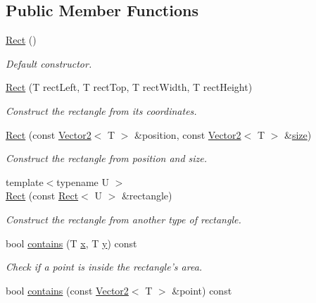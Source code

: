 \subsection*{Public Member Functions}
\begin{DoxyCompactItemize}
\item 
\hyperlink{classsf_1_1_rect_a0f87ebaef9722a6222fd2e04ce8efb37}{Rect} ()
\begin{DoxyCompactList}\small\item\em Default constructor. \end{DoxyCompactList}\item 
\hyperlink{classsf_1_1_rect_a15cdbc5a1aed3a8fc7be1bd5004f19f9}{Rect} (T rect\-Left, T rect\-Top, T rect\-Width, T rect\-Height)
\begin{DoxyCompactList}\small\item\em Construct the rectangle from its coordinates. \end{DoxyCompactList}\item 
\hyperlink{classsf_1_1_rect_a27fdf85caa6d12caeeff78913cc59936}{Rect} (const \hyperlink{classsf_1_1_vector2}{Vector2}$<$ T $>$ \&position, const \hyperlink{classsf_1_1_vector2}{Vector2}$<$ T $>$ \&\hyperlink{gl3_8h_a79ef9eb3e59c4bb34c4b9fbeb8d28ff7}{size})
\begin{DoxyCompactList}\small\item\em Construct the rectangle from position and size. \end{DoxyCompactList}\item 
{\footnotesize template$<$typename U $>$ }\\\hyperlink{classsf_1_1_rect_a6fff2bb7e93677839461a66bc2957de0}{Rect} (const \hyperlink{classsf_1_1_rect}{Rect}$<$ U $>$ \&rectangle)
\begin{DoxyCompactList}\small\item\em Construct the rectangle from another type of rectangle. \end{DoxyCompactList}\item 
bool \hyperlink{classsf_1_1_rect_aa8a5364c84de6dd5299f833b54e31ef1}{contains} (T \hyperlink{gl3_8h_a92d0386e5c19fb81ea88c9f99644ab1d}{x}, T \hyperlink{gl3_8h_a66ddd433d2cacfe27f5906b7e86faeed}{y}) const 
\begin{DoxyCompactList}\small\item\em Check if a point is inside the rectangle's area. \end{DoxyCompactList}\item 
bool \hyperlink{classsf_1_1_rect_a24163acdb9b2987c0ea55c201e270d41}{contains} (const \hyperlink{classsf_1_1_vector2}{Vector2}$<$ T $>$ \&point) const 

\end{DoxyCompactItemize}
